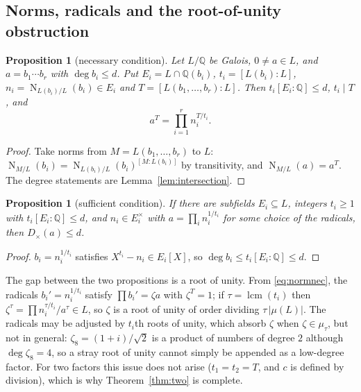 \documentclass[11pt,a4paper]{article}
\newtheorem{proposition}[theorem]{Proposition}
\theoremstyle{definition}
\theoremstyle{remark}
\newcommand{\Q}{\mathbb{Q}}
\newcommand{\Nm}{\operatorname{N}}
\newcommand{\lcm}{\operatorname{lcm}}
\newcommand{\dg}{\deg}
\newcommand{\Dt}{D_{\times}}
\begin{document}
\subsection{Norms, radicals and the root-of-unity obstruction}

\begin{proposition}[necessary condition]\label{prop:normnec}
Let $L/\Q$ be Galois, $0\ne a\in L$, and $a=b_1\cdots b_r$ with $\dg b_i\le d$.  Put $E_i=L\cap\Q(b_i)$,
$t_i=[L(b_i):L]$, $n_i=\Nm_{L(b_i)/L}(b_i)\in E_i$ and $T=[L(b_1,\dots,b_r):L]$.  Then $t_i[E_i:\Q]\le d$,
$t_i\mid T$, and
\begin{equation}\label{eq:normnec}
 a^T=\prod_{i=1}^rn_i^{T/t_i}.
\end{equation}
\end{proposition}

\begin{proof}
Take norms from $M=L(b_1,\dots,b_r)$ to $L$: $\Nm_{M/L}(b_i)=\Nm_{L(b_i)/L}(b_i)^{[M:L(b_i)]}$ by
transitivity, and $\Nm_{M/L}(a)=a^T$.  The degree statements are Lemma~\ref{lem:intersection}.
\end{proof}

\begin{proposition}[sufficient condition]\label{prop:radsuff}
If there are subfields $E_i\subseteq L$, integers $t_i\ge1$ with $t_i[E_i:\Q]\le d$, and $n_i\in E_i^\times$
with $a=\prod_in_i^{1/t_i}$ for some choice of the radicals, then $\Dt(a)\le d$.
\end{proposition}

\begin{proof}
$b_i=n_i^{1/t_i}$ satisfies $X^{t_i}-n_i\in E_i[X]$, so $\dg b_i\le t_i[E_i:\Q]\le d$.
\end{proof}

The gap between the two propositions is a root of unity.  From \eqref{eq:normnec}, the radicals
$b_i'=n_i^{1/t_i}$ satisfy $\prod b_i'=\zeta a$ with $\zeta^T=1$; if $\tau=\lcm(t_i)$ then $\zeta^\tau=
\prod n_i^{\tau/t_i}/a^\tau\in L$, so $\zeta$ is a root of unity of order dividing $\tau\,|\mu(L)|$.
The radicals may be adjusted by $t_i$th roots of unity, which absorb $\zeta$ when $\zeta\in\mu_\tau$,
but not in general: $\zeta_8=(1+i)/\sqrt2$ is a product of numbers of degree $2$ although $\dg\zeta_8=4$,
so a stray root of unity cannot simply be appended as a low-degree factor.  For two factors this issue
does not arise ($t_1=t_2=T$, and $c$ is defined by division), which is why Theorem~\ref{thm:two} is
complete.
\end{document}
